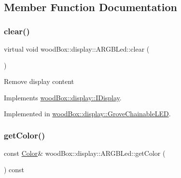 \subsection{Member Function Documentation}
\mbox{\label{classwood_box_1_1display_1_1_a_r_g_b_led_a01eeaee1bbb439e81f5f9bc536c04df7}} 
\subsubsection{\texorpdfstring{clear()}{clear()}}
{\footnotesize\ttfamily virtual void wood\+Box\+::display\+::\+A\+R\+G\+B\+Led\+::clear (\begin{DoxyParamCaption}{ }\end{DoxyParamCaption})\hspace{0.3cm}{\ttfamily [pure virtual]}}

Remove display content 

Implements \mbox{\hyperlink{classwood_box_1_1display_1_1_i_display_a7030f0768c1ef15ce936a259406168dc}{wood\+Box\+::display\+::\+I\+Display}}.



Implemented in \mbox{\hyperlink{classwood_box_1_1display_1_1_grove_chainable_l_e_d_a1c42c42ee9643aa914ab20a191e4adfd}{wood\+Box\+::display\+::\+Grove\+Chainable\+L\+ED}}.

\mbox{\label{classwood_box_1_1display_1_1_a_r_g_b_led_ae0bd01eab303006612eb46058824b0c1}} 
\subsubsection{\texorpdfstring{get\+Color()}{getColor()}}
{\footnotesize\ttfamily const \mbox{\hyperlink{structwood_box_1_1display_1_1_a_r_g_b_led_1_1_color}{Color}}\& wood\+Box\+::display\+::\+A\+R\+G\+B\+Led\+::get\+Color (\begin{DoxyParamCaption}{ }\end{DoxyParamCaption}) const\hspace{0.3cm}{\ttfamily [inline]}}

